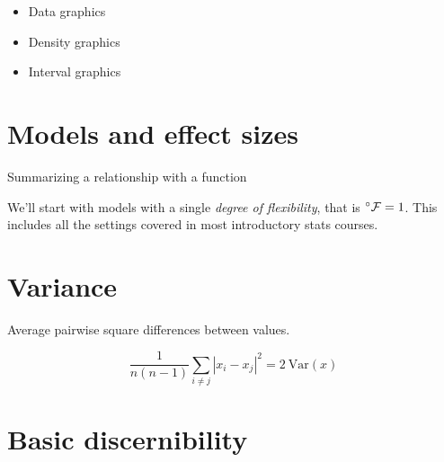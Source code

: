 \documentclass[]{book}
\providecommand{\tightlist}{%
  \setlength{\itemsep}{0pt}\setlength{\parskip}{0pt}}
\begin{document}
\begin{itemize}
\tightlist
\item
  Data graphics
\item
  Density graphics
\item
  Interval graphics
\end{itemize}

\hypertarget{models-and-effect-sizes}{%
\section{Models and effect sizes}\label{models-and-effect-sizes}}

Summarizing a relationship with a function

We'll start with models with a single \emph{degree of flexibility}, that is \(^\circ{\cal F} = 1\). This includes all the settings covered in most introductory stats courses.

\hypertarget{variance}{%
\section{Variance}\label{variance}}

Average pairwise square differences between values.

\[\frac{1}{n (n-1)}\sum_{i \neq j} |x_i - x_j|^2 = 2\  \mbox{Var}(x)\]

\hypertarget{basic-discernibility}{%
\section{Basic discernibility}\label{basic-discernibility}}
\end{document}
